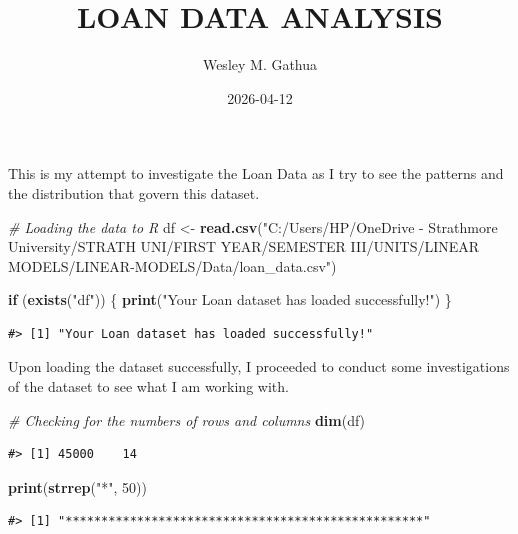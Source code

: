 \documentclass[
  10pt,
]{article}
\title{LOAN DATA ANALYSIS}
\author{Wesley M. Gathua}
\date{2026-04-12}
\newenvironment{Shaded}{\begin{snugshade}}{\end{snugshade}}
\newcommand{\CommentTok}[1]{\textcolor[rgb]{0.56,0.35,0.01}{\textit{#1}}}
\newcommand{\ControlFlowTok}[1]{\textcolor[rgb]{0.13,0.29,0.53}{\textbf{#1}}}
\newcommand{\DecValTok}[1]{\textcolor[rgb]{0.00,0.00,0.81}{#1}}
\newcommand{\FunctionTok}[1]{\textcolor[rgb]{0.13,0.29,0.53}{\textbf{#1}}}
\newcommand{\NormalTok}[1]{#1}
\newcommand{\OtherTok}[1]{\textcolor[rgb]{0.56,0.35,0.01}{#1}}
\newcommand{\StringTok}[1]{\textcolor[rgb]{0.31,0.60,0.02}{#1}}
\begin{document}
\maketitle

This is my attempt to investigate the Loan Data as I try to see the
patterns and the distribution that govern this dataset.

\begin{Shaded}
\begin{Highlighting}[]
\CommentTok{\# Loading the data to R}
\NormalTok{df }\OtherTok{\textless{}{-}} \FunctionTok{read.csv}\NormalTok{(}\StringTok{"C:/Users/HP/OneDrive {-} Strathmore University/STRATH UNI/FIRST YEAR/SEMESTER III/UNITS/LINEAR MODELS/LINEAR{-}MODELS/Data/loan\_data.csv"}\NormalTok{)}

\ControlFlowTok{if}\NormalTok{ (}\FunctionTok{exists}\NormalTok{(}\StringTok{"df"}\NormalTok{)) \{}
    \FunctionTok{print}\NormalTok{(}\StringTok{"Your Loan dataset has loaded successfully!"}\NormalTok{)}
\NormalTok{\}}
\end{Highlighting}
\end{Shaded}

\begin{verbatim}
#> [1] "Your Loan dataset has loaded successfully!"
\end{verbatim}

Upon loading the dataset successfully, I proceeded to conduct some
investigations of the dataset to see what I am working with.

\begin{Shaded}
\begin{Highlighting}[]
\CommentTok{\# Checking for the numbers of rows and columns}
\FunctionTok{dim}\NormalTok{(df)}
\end{Highlighting}
\end{Shaded}

\begin{verbatim}
#> [1] 45000    14
\end{verbatim}

\begin{Shaded}
\begin{Highlighting}[]
\FunctionTok{print}\NormalTok{(}\FunctionTok{strrep}\NormalTok{(}\StringTok{"*"}\NormalTok{, }\DecValTok{50}\NormalTok{))}
\end{Highlighting}
\end{Shaded}

\begin{verbatim}
#> [1] "**************************************************"
\end{verbatim}
\end{document}
